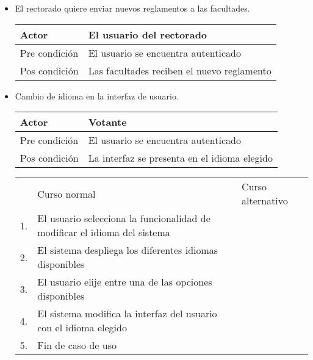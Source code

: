 \begin{itemize}
\bigskip
\item El rectorado quiere enviar nuevos reglamentos a las facultades.
\begin{center}
\begin{tabular}{ll}
Actor & El usuario del rectorado \\
\hline
Pre condici\'on & El usuario se encuentra autenticado \\
\hline
Pos condici\'on & Las facultades reciben el nuevo reglamento \\
\hline
\end{tabular}
\medskip
\end{center}

\bigskip
\item Cambio de idioma en la interfaz de usuario.
\begin{center}
\begin{tabular}{ll}
Actor & Votante \\
\hline
Pre condición & El usuario se encuentra autenticado \\
\hline
Pos condición & La interfaz se presenta en el idioma elegido \\
\hline
\end{tabular}
\medskip
\begin{tabular}{c p{4cm}|p{4cm}}
 & Curso normal & Curso alternativo \\
 1. & El usuario selecciona la funcionalidad de modificar el idioma del sistema &   \\
 2. & El sistema despliega los diferentes idiomas disponibles &   \\
 3. & El usuario elije entre una de las opciones disponibles & \\
 4. & El sistema modifica la interfaz del usuario con el idioma elegido & \\
 5. & Fin de caso de uso & \\
\end{tabular}
\end{center}




\end{itemize}

